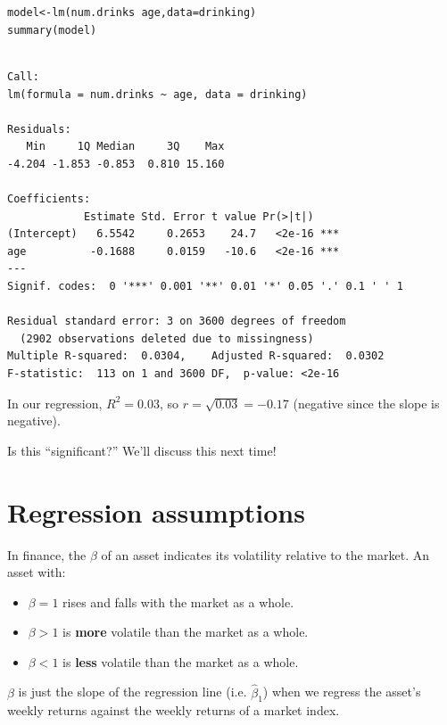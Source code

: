 \documentclass{beamer}\usepackage[]{graphicx}\usepackage[]{color}
\makeatletter
\newcommand{\hlopt}[1]{\textcolor[rgb]{1,0.894,0.769}{#1}}%
\newcommand{\hlstd}[1]{\textcolor[rgb]{1,0.894,0.769}{#1}}%
\newcommand{\hlkwb}[1]{\textcolor[rgb]{0.804,0.776,0.451}{#1}}%
\newcommand{\hlkwc}[1]{\textcolor[rgb]{0.78,0.941,0.545}{#1}}%
\newcommand{\hlkwd}[1]{\textcolor[rgb]{1,0.78,0.769}{#1}}%
\newenvironment{kframe}{%
 \def\at@end@of@kframe{}%
 \ifinner\ifhmode%
  \def\at@end@of@kframe{\end{minipage}}%
  \begin{minipage}{\columnwidth}%
 \fi\fi%
 \def\FrameCommand##1{\hskip\@totalleftmargin \hskip-\fboxsep
 \colorbox{shadecolor}{##1}\hskip-\fboxsep
     \hskip-\linewidth \hskip-\@totalleftmargin \hskip\columnwidth}%
 \MakeFramed {\advance\hsize-\width
   \@totalleftmargin\z@ \linewidth\hsize
   \@setminipage}}%
 {\par\unskip\endMakeFramed%
 \at@end@of@kframe}
\newenvironment{knitrout}{}{} %
\makeatother
\begin{document}
\begin{darkframes}
    \begin{frame}[fragile]
      \fontsize{9}{9}\selectfont
\begin{knitrout}
\color{fgcolor}\begin{kframe}
\begin{alltt}
\hlstd{model} \hlkwb{<-} \hlkwd{lm}\hlstd{(num.drinks} \hlopt{~} \hlstd{age,} \hlkwc{data}\hlstd{=drinking)}
\hlkwd{summary}\hlstd{(model)}
\end{alltt}
\begin{verbatim}

Call:
lm(formula = num.drinks ~ age, data = drinking)

Residuals:
   Min     1Q Median     3Q    Max 
-4.204 -1.853 -0.853  0.810 15.160 

Coefficients:
            Estimate Std. Error t value Pr(>|t|)    
(Intercept)   6.5542     0.2653    24.7   <2e-16 ***
age          -0.1688     0.0159   -10.6   <2e-16 ***
---
Signif. codes:  0 '***' 0.001 '**' 0.01 '*' 0.05 '.' 0.1 ' ' 1

Residual standard error: 3 on 3600 degrees of freedom
  (2902 observations deleted due to missingness)
Multiple R-squared:  0.0304,	Adjusted R-squared:  0.0302 
F-statistic:  113 on 1 and 3600 DF,  p-value: <2e-16
\end{verbatim}
\end{kframe}
\end{knitrout}
    \end{frame}

    \begin{frame}
      In our regression, $R^2=0.03$, so $r=\sqrt{0.03}=-0.17$ (negative since the slope is negative).

      \pause\vspace{0.3in}
      Is this ``significant?'' \pause \alert{We'll discuss this next time!}
    \end{frame}

    \section{Regression assumptions}

    \begin{frame}
      In finance, the $\beta$ of an asset indicates its volatility relative to the market. An asset with:
      \pause
      \begin{itemize}[<+->]
        \item $\beta=1$ rises and falls with the market as a whole.
        \item $\beta>1$ is \textbf{more} volatile than the market as a whole.
        \item $\beta<1$ is \textbf{less} volatile than the market as a whole.
      \end{itemize}
      \pause
      $\beta$ is just the slope of the regression line (i.e. $\hat\beta_1$) when we regress the asset's weekly returns against the weekly returns of a market index.
    \end{frame}


\end{darkframes}
\end{document}
